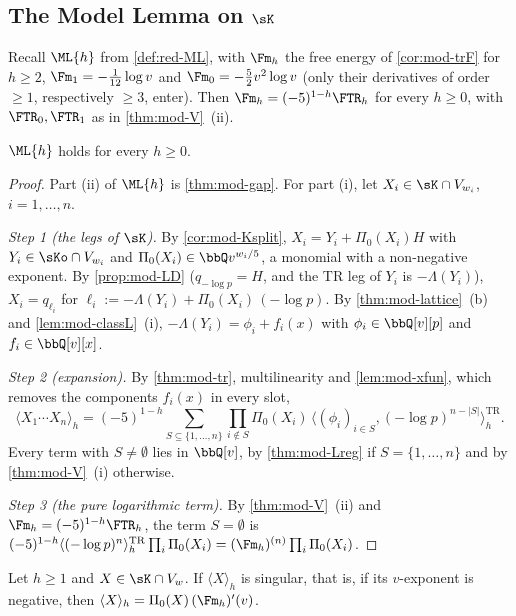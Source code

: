 \subsection{The Model Lemma on \texorpdfstring{$\sK$}{K}}
\label{sec:mod-MLK}

Recall $\ML{h}$ from \cref{def:red-ML}, with $\Fm_h$ the free energy of \cref{cor:mod-trF} for $h\geq 2$, $\Fm_1=-\frac1{12}\log v$ and $\Fm_0=-\frac52v^2\log v$ (only their derivatives of order $\geq 1$, respectively $\geq 3$, enter). Then $\Fm_h=(-5)^{1-h}\FTR_h$ for every $h\geq 0$, with $\FTR_0,\FTR_1$ as in \cref{thm:mod-V}~(ii).

\begin{thm}
\label{thm:mod-MLK}
$\ML{h}$ holds for every $h\geq 0$.
\end{thm}

\begin{proof}
Part (ii) of $\ML{h}$ is \cref{thm:mod-gap}. For part (i), let $X_i\in\sK\cap V_{w_i}$, $i=1,\dots,n$.

\emph{Step 1 (the legs of $\sK$).} By \cref{cor:mod-Ksplit}, $X_i=Y_i+\Pi_0(X_i)H$ with $Y_i\in\sKo\cap V_{w_i}$ and $\Pi_0(X_i)\in\bbQ v^{w_i/5}$, a monomial with a non-negative exponent. By \cref{prop:mod-LD} ($q_{-\log p}=H$, and the TR leg of $Y_i$ is $-\Lambda(Y_i)$), $X_i=q_{\ell_i}$ for $\ell_i:=-\Lambda(Y_i)+\Pi_0(X_i)\,(-\log p)$. By \cref{thm:mod-lattice}~(b) and \cref{lem:mod-classL}~(i), $-\Lambda(Y_i)=\phi_i+f_i(x)$ with $\phi_i\in\bbQ[v][p]$ and $f_i\in\bbQ[v][x]$.

\emph{Step 2 (expansion).} By \cref{thm:mod-tr}, multilinearity and \cref{lem:mod-xfun}, which removes the components $f_i(x)$ in every slot,
\[
\langle X_1\cdots X_n\rangle_h=(-5)^{1-h}\sum_{S\subseteq\{1,\dots,n\}}\prod_{i\notin S}\Pi_0(X_i)\,\big\langle(\phi_i)_{i\in S},(-\log p)^{n-|S|}\big\rangle^{\mathrm{TR}}_h .
\]
Every term with $S\neq\emptyset$ lies in $\bbQ[v]$, by \cref{thm:mod-Lreg} if $S=\{1,\dots,n\}$ and by \cref{thm:mod-V}~(i) otherwise.

\emph{Step 3 (the pure logarithmic term).} By \cref{thm:mod-V}~(ii) and $\Fm_h=(-5)^{1-h}\FTR_h$, the term $S=\emptyset$ is $(-5)^{1-h}\langle(-\log p)^n\rangle^{\mathrm{TR}}_h\prod_i\Pi_0(X_i)=(\Fm_h)^{(n)}\prod_i\Pi_0(X_i)$.
\end{proof}

\begin{cor}
\label{cor:mod-onepoint}
Let $h\geq 1$ and $X\in\sK\cap V_w$. If $\langle X\rangle_h$ is singular, that is, if its $v$-exponent is negative, then $\langle X\rangle_h=\Pi_0(X)\,(\Fm_h)'(v)$.
\end{cor}

